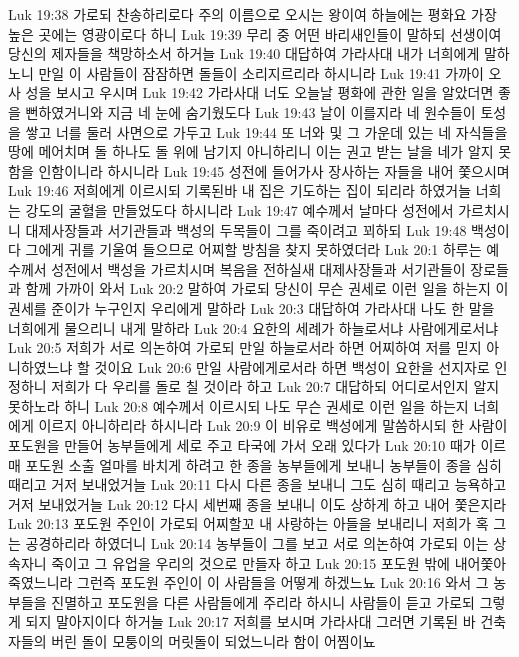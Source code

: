 Luk 19:38  가로되 찬송하리로다 주의 이름으로 오시는 왕이여 하늘에는 평화요 가장 높은 곳에는 영광이로다 하니
Luk 19:39  무리 중 어떤 바리새인들이 말하되 선생이여 당신의 제자들을 책망하소서 하거늘
Luk 19:40  대답하여 가라사대 내가 너희에게 말하노니 만일 이 사람들이 잠잠하면 돌들이 소리지르리라 하시니라
Luk 19:41  가까이 오사 성을 보시고 우시며
Luk 19:42  가라사대 너도 오늘날 평화에 관한 일을 알았더면 좋을 뻔하였거니와 지금 네 눈에 숨기웠도다
Luk 19:43  날이 이를지라 네 원수들이 토성을 쌓고 너를 둘러 사면으로 가두고
Luk 19:44  또 너와 및 그 가운데 있는 네 자식들을 땅에 메어치며 돌 하나도 돌 위에 남기지 아니하리니 이는 권고 받는 날을 네가 알지 못함을 인함이니라 하시니라
Luk 19:45  성전에 들어가사 장사하는 자들을 내어 쫓으시며
Luk 19:46  저희에게 이르시되 기록된바 내 집은 기도하는 집이 되리라 하였거늘 너희는 강도의 굴혈을 만들었도다 하시니라
Luk 19:47  예수께서 날마다 성전에서 가르치시니 대제사장들과 서기관들과 백성의 두목들이 그를 죽이려고 꾀하되
Luk 19:48  백성이 다 그에게 귀를 기울여 들으므로 어찌할 방침을 찾지 못하였더라
Luk 20:1  하루는 예수께서 성전에서 백성을 가르치시며 복음을 전하실새 대제사장들과 서기관들이 장로들과 함께 가까이 와서
Luk 20:2  말하여 가로되 당신이 무슨 권세로 이런 일을 하는지 이 권세를 준이가 누구인지 우리에게 말하라
Luk 20:3  대답하여 가라사대 나도 한 말을 너희에게 물으리니 내게 말하라
Luk 20:4  요한의 세례가 하늘로서냐 사람에게로서냐
Luk 20:5  저희가 서로 의논하여 가로되 만일 하늘로서라 하면 어찌하여 저를 믿지 아니하였느냐 할 것이요
Luk 20:6  만일 사람에게로서라 하면 백성이 요한을 선지자로 인정하니 저희가 다 우리를 돌로 칠 것이라 하고
Luk 20:7  대답하되 어디로서인지 알지 못하노라 하니
Luk 20:8  예수께서 이르시되 나도 무슨 권세로 이런 일을 하는지 너희에게 이르지 아니하리라 하시니라
Luk 20:9  이 비유로 백성에게 말씀하시되 한 사람이 포도원을 만들어 농부들에게 세로 주고 타국에 가서 오래 있다가
Luk 20:10  때가 이르매 포도원 소출 얼마를 바치게 하려고 한 종을 농부들에게 보내니 농부들이 종을 심히 때리고 거저 보내었거늘
Luk 20:11  다시 다른 종을 보내니 그도 심히 때리고 능욕하고 거저 보내었거늘
Luk 20:12  다시 세번째 종을 보내니 이도 상하게 하고 내어 쫓은지라
Luk 20:13  포도원 주인이 가로되 어찌할꼬 내 사랑하는 아들을 보내리니 저희가 혹 그는 공경하리라 하였더니
Luk 20:14  농부들이 그를 보고 서로 의논하여 가로되 이는 상속자니 죽이고 그 유업을 우리의 것으로 만들자 하고
Luk 20:15  포도원 밖에 내어쫓아 죽였느니라 그런즉 포도원 주인이 이 사람들을 어떻게 하겠느뇨
Luk 20:16  와서 그 농부들을 진멸하고 포도원을 다른 사람들에게 주리라 하시니 사람들이 듣고 가로되 그렇게 되지 말아지이다 하거늘
Luk 20:17  저희를 보시며 가라사대 그러면 기록된 바 건축자들의 버린 돌이 모퉁이의 머릿돌이 되었느니라 함이 어찜이뇨

